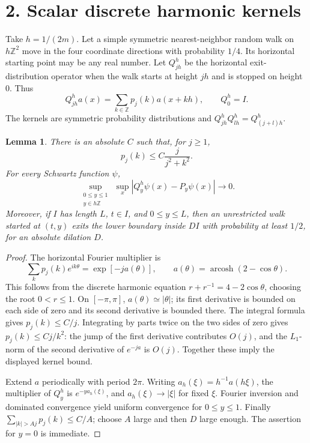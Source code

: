 \documentclass[11pt]{article}
\newtheorem{lemma}[theorem]{Lemma}
\begin{document}
\section*{2. Scalar discrete harmonic kernels}
Take \(h=1/(2m)\). Let a simple symmetric nearest-neighbor random walk
on \(h\mathbb Z^2\) move in the four coordinate directions with probability
\(1/4\). Its horizontal starting point may be any real number.
Let \(Q^h_{jh}\) be the horizontal exit-distribution operator when the
walk starts at height \(jh\) and is stopped on height \(0\). Thus
\[
 Q^h_{jh}a(x)=\sum_{k\in\mathbb Z}p_j(k)a(x+kh),\qquad Q^h_0=I.
\]
The kernels are symmetric probability distributions and
\(Q^h_{jh}Q^h_{lh}=Q^h_{(j+l)h}\).

\begin{lemma}\label{lem:kernel}
There is an absolute \(C\) such that, for \(j\ge1\),
\[
 p_j(k)\le C\frac{j}{j^2+k^2}.
\]
For every Schwartz function \(\psi\),
\[
 \sup_{\substack{0\le y\le1\\y\in h\mathbb Z}}\,
 \sup_x |Q^h_y\psi(x)-P_y\psi(x)|\longrightarrow0.
\]
Moreover, if \(I\) has length \(L\), \(t\in I\), and \(0\le y\le L\),
then an unrestricted walk started at \((t,y)\) exits the lower boundary
inside \(DI\) with probability at least \(1/2\), for an absolute
dilation \(D\).
\end{lemma}

\begin{proof}
The horizontal Fourier multiplier is
\[
 \sum_kp_j(k)e^{ik\theta}
 =\exp[-j a(\theta)],\qquad
 a(\theta)=\operatorname{arcosh}(2-\cos\theta).
\]
This follows from the discrete harmonic equation
\(r+r^{-1}=4-2\cos\theta\), choosing the root \(0<r\le1\).
On \([-\pi,\pi]\), \(a(\theta)\simeq|\theta|\); its first derivative is
bounded on each side of zero and its second derivative is bounded there.
The integral formula gives \(p_j(k)\le C/j\). Integrating by parts
twice on the two sides of zero gives \(p_j(k)\le Cj/k^2\):
the jump of the first derivative contributes \(O(j)\), and the
\(L_1\)-norm of the second derivative of \(e^{-ja}\) is \(O(j)\).
Together these imply the displayed kernel bound.

Extend \(a\) periodically with period \(2\pi\).
Writing \(a_h(\xi)=h^{-1}a(h\xi)\), the multiplier of \(Q^h_y\) is
\(e^{-ya_h(\xi)}\), and \(a_h(\xi)\to|\xi|\) for fixed \(\xi\).
Fourier inversion and dominated convergence yield uniform convergence
for \(0\le y\le1\).
Finally
\(\sum_{|k|>Aj}p_j(k)\le C/A\); choose \(A\) large and then \(D\)
large enough. The assertion for \(y=0\) is immediate.
\end{proof}
\end{document}
